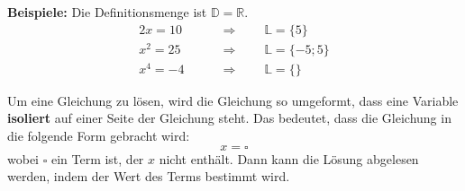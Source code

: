 \begin{example}
  \textbf{Beispiele:} Die Definitionsmenge ist $\mathbb{D} = \mathbb{R}$.
  \begin{align*}
     2x = 10 \qquad&\Rightarrow\qquad \mathbb{L} = \{5\} \\
    x^2 = 25 \qquad&\Rightarrow\qquad \mathbb{L} = \{-5; 5\} \\
    x^4 = -4 \qquad&\Rightarrow\qquad \mathbb{L} = \{\}
  \end{align*}
\end{example}

Um eine Gleichung zu lösen, wird die Gleichung so umgeformt, dass eine Variable \textbf{isoliert} auf einer Seite der Gleichung steht. Das bedeutet, dass die Gleichung in die folgende Form gebracht wird:
\[
  x = \square
\]
wobei $\square$ ein Term ist, der $x$ nicht enthält. Dann kann die Lösung abgelesen werden, indem der Wert des Terms bestimmt wird.
